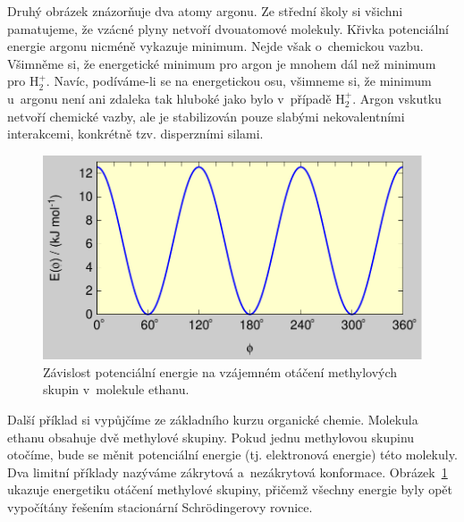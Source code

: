 Druhý obrázek znázorňuje dva atomy argonu. Ze střední školy si všichni pamatujeme, že vzácné plyny netvoří dvouatomové molekuly. Křivka potenciální energie argonu nicméně vykazuje minimum. Nejde však o~chemickou vazbu. Všimněme si, že energetické minimum pro argon je mnohem dál než minimum pro $\mathrm{H}_2^+$. Navíc, podíváme-li se na energetickou osu, všimneme si, že minimum u~argonu není ani zdaleka tak hluboké jako bylo v~případě $\mathrm{H}_2^+$. Argon vskutku netvoří chemické vazby, ale je stabilizován pouze slabými nekovalentními interakcemi, konkrétně tzv. disperzními silami.


\begin{figure} [ht]
\centering
\includegraphics[scale=0.9]{obrazky/ethane.pdf}
\caption[Torzní bariéra ethanu]{Závislost potenciální energie na vzájemném otáčení methylových skupin v~molekule ethanu.}
\label{obr:mol:ethan}
\end{figure}

Další příklad si vypůjčíme ze základního kurzu organické chemie. Molekula ethanu obsahuje dvě methylové skupiny. Pokud jednu methylovou skupinu otočíme, bude se měnit potenciální energie (tj. elektronová energie) této molekuly. Dva limitní příklady nazýváme zákrytová a~nezákrytová konformace. Obrázek~\ref{obr:mol:ethan} ukazuje energetiku otáčení methylové skupiny, přičemž všechny energie byly opět vypočítány řešením stacionární Schrödingerovy rovnice.

